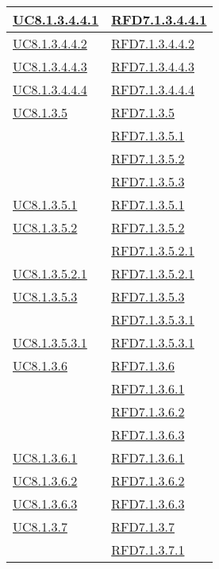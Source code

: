 \begin{longtable}{|>{\centering}m{5cm}|m{5cm}<{\centering}|}
\hyperref[UC8.1.3.4.4.1]{UC8.1.3.4.4.1} & \hyperlink{RFD7.1.3.4.4.1}{RFD7.1.3.4.4.1}\\ \hline
\hyperref[UC8.1.3.4.4.2]{UC8.1.3.4.4.2} & \hyperlink{RFD7.1.3.4.4.2}{RFD7.1.3.4.4.2}\\ \hline
\hyperref[UC8.1.3.4.4.3]{UC8.1.3.4.4.3} & \hyperlink{RFD7.1.3.4.4.3}{RFD7.1.3.4.4.3}\\ \hline
\hyperref[UC8.1.3.4.4.4]{UC8.1.3.4.4.4} & \hyperlink{RFD7.1.3.4.4.4}{RFD7.1.3.4.4.4}\\ \hline
\hyperref[UC8.1.3.5]{UC8.1.3.5} & \hyperlink{RFD7.1.3.5}{RFD7.1.3.5}\\
& \hyperlink{RFD7.1.3.5.1}{RFD7.1.3.5.1}\\
& \hyperlink{RFD7.1.3.5.2}{RFD7.1.3.5.2}\\
& \hyperlink{RFD7.1.3.5.3}{RFD7.1.3.5.3}\\ \hline
\hyperref[UC8.1.3.5.1]{UC8.1.3.5.1} & \hyperlink{RFD7.1.3.5.1}{RFD7.1.3.5.1}\\ \hline
\hyperref[UC8.1.3.5.2]{UC8.1.3.5.2} & \hyperlink{RFD7.1.3.5.2}{RFD7.1.3.5.2}\\
& \hyperlink{RFD7.1.3.5.2.1}{RFD7.1.3.5.2.1}\\ \hline
\hyperref[UC8.1.3.5.2.1]{UC8.1.3.5.2.1} & \hyperlink{RFD7.1.3.5.2.1}{RFD7.1.3.5.2.1}\\ \hline
\hyperref[UC8.1.3.5.3]{UC8.1.3.5.3} & \hyperlink{RFD7.1.3.5.3}{RFD7.1.3.5.3}\\
& \hyperlink{RFD7.1.3.5.3.1}{RFD7.1.3.5.3.1}\\ \hline
\hyperref[UC8.1.3.5.3.1]{UC8.1.3.5.3.1} & \hyperlink{RFD7.1.3.5.3.1}{RFD7.1.3.5.3.1}\\ \hline
\hyperref[UC8.1.3.6]{UC8.1.3.6} & \hyperlink{RFD7.1.3.6}{RFD7.1.3.6}\\
& \hyperlink{RFD7.1.3.6.1}{RFD7.1.3.6.1}\\
& \hyperlink{RFD7.1.3.6.2}{RFD7.1.3.6.2}\\
& \hyperlink{RFD7.1.3.6.3}{RFD7.1.3.6.3}\\ \hline
\hyperref[UC8.1.3.6.1]{UC8.1.3.6.1} & \hyperlink{RFD7.1.3.6.1}{RFD7.1.3.6.1}\\ \hline
\hyperref[UC8.1.3.6.2]{UC8.1.3.6.2} & \hyperlink{RFD7.1.3.6.2}{RFD7.1.3.6.2}\\ \hline
\hyperref[UC8.1.3.6.3]{UC8.1.3.6.3} & \hyperlink{RFD7.1.3.6.3}{RFD7.1.3.6.3}\\ \hline
\hyperref[UC8.1.3.7]{UC8.1.3.7} & \hyperlink{RFD7.1.3.7}{RFD7.1.3.7}\\
& \hyperlink{RFD7.1.3.7.1}{RFD7.1.3.7.1}\\

\end{longtable}
